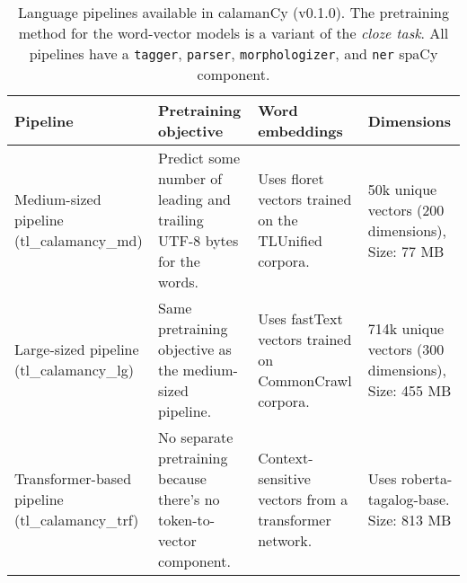 \documentclass[../emnlp2023.tex]{subfiles}
\begin{document}
\begin{table*}[t]
\begin{tabular}{@{}p{3cm}p{4cm}p{4cm}p{3.75cm}@{}}
\toprule
Pipeline  &  Pretraining objective & Word embeddings & Dimensions \\ \midrule
Medium-sized pipeline (tl\_calamancy\_md) & Predict some number of leading and trailing UTF-8 bytes for the words. & Uses floret vectors trained on the TLUnified corpora. & 50k unique vectors (200 dimensions), Size: 77 MB\\
Large-sized pipeline (tl\_calamancy\_lg)  & Same pretraining objective as the medium-sized pipeline.    & Uses fastText vectors trained on CommonCrawl corpora.                  & 714k unique vectors (300 dimensions), Size: 455 MB \\
Transformer-based pipeline (tl\_calamancy\_trf) & No separate pretraining because there's no token-to-vector component. & Context-sensitive vectors from a transformer network.      & Uses roberta-tagalog-base. Size: 813 MB  \\ \bottomrule
\end{tabular}
\caption{
    Language pipelines available in calamanCy (v0.1.0).
    The pretraining method for the word-vector models is a variant of the \textit{cloze task}.
    All pipelines have a \texttt{tagger}, \texttt{parser}, \texttt{morphologizer}, and \texttt{ner} spaCy component.
}
\label{table:calamancy_pipelines}
\end{table*}
\end{document}
